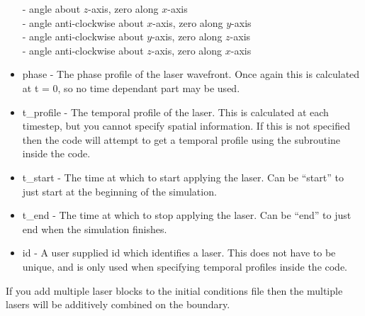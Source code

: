\begin{itemize}
 - angle about $z$-axis, zero along $x$-axis\\
 - angle anti-clockwise about $x$-axis, zero along $y$-axis\\
 - angle anti-clockwise about $y$-axis, zero along $z$-axis\\
 - angle anti-clockwise about $z$-axis, zero along $x$-axis
\item phase - The phase profile of the laser wavefront. Once again this is
  calculated at t = 0, so no time dependant part may be used.
\item t\_profile - The temporal profile of the laser. This is calculated at
  each timestep, but you cannot specify spatial information. If this is not
  specified then the code will attempt to get a temporal profile using the
   subroutine inside the code.
\item t\_start - The time at which to start applying the laser. Can be
  ``start'' to just start at the beginning of the simulation.
\item t\_end - The time at which to stop applying the laser. Can be ``end'' to
  just end when the simulation finishes.
\item id - A user supplied id which identifies a laser. This does not have to
  be unique, and is only used when specifying temporal profiles inside the
  code.
\end{itemize}

If you add multiple laser blocks to the initial conditions file then the
multiple lasers will be additively combined on the boundary.

